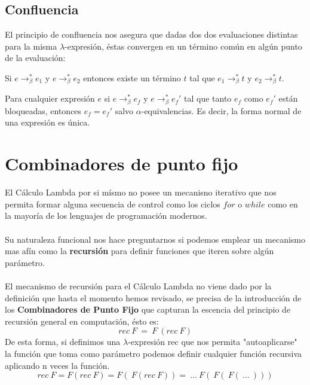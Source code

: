                 \subsection{Confluencia}
                    El principio de confluencia nos asegura que dadas dos dos evaluaciones distintas para la misma $\lambda$-expresión, éstas convergen en un término común en algún punto de la evaluación:

                    \begin{theorem} Si $e\to_\beta^* e_1$ y $e\to_\beta^*e_2$ entonces existe un término $t$ tal que  $e_1\to_\beta^* t$ y $e_2\to_\beta^* t$.
                    \end{theorem}


                    \begin{corollary} Para cualquier expresión $e$ si $e\to_\beta^*e_f$ y $e\to_\beta^*e_f'$ tal que tanto $e_f$ como $e_f'$ están bloqueadas, entonces $e_f = e_f'$ salvo $\alpha$-equivalencias. Es decir, la forma normal de una expresión es única.
                    \end{corollary}

        \section{Combinadores de punto fijo}
                    El Cálculo Lambda por si mísmo no posee un mecanisno iterativo que nos permita formar alguna secuencia de control como los ciclos \textbf{$for$} o \textbf{$while$} como en la mayoría de los lenguajes de programación modernos.\\\\
                    Su naturaleza funcional nos hace preguntarnos si podemos emplear un mecanismo mas afín como la \textbf{recursión} para definir funciones que iteren sobre algún parámetro.\\\\
                    El mecanismo de recursión para el Cálculo Lambda no viene dado por la definición que hasta el momento hemos revisado, se precisa de la introducción de los \textbf{Combinadores de Punto Fijo} que capturan la escencia del principio de recursión general en computación, ésto es:
                    $$ rec\ F\ =\ F\ (rec\ F) $$
                    De esta forma, si definimos una $\lambda$-expresión rec que nos permita "autoaplicarse" la función que toma como parámetro podemos definir cualquier función recursiva aplicando n veces la función.
                    $$rec\ F = F(rec\ F) = F(\ F(rec\ F)) =\ ...\ F(\ F(\ F(\ ...\ )))$$
                    
